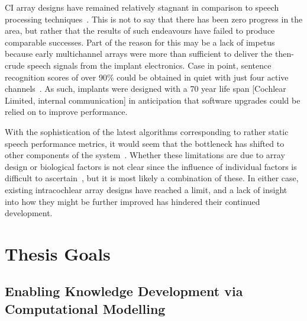 CI array designs have remained relatively stagnant in comparison to speech
processing techniques~\cite{girzon1987, micco2006, whiten2007}. This is not to
say that there has been zero progress in the area, but rather that the results
of such endeavours have failed to produce comparable successes. Part of the
reason for this may be a lack of impetus because early multichannel arrays were
more than sufficient to deliver the then-crude speech signals from the implant
electronics. Case in point, sentence recognition scores of over 90\% could be
obtained in quiet with just four active channels~\cite{shannon1995, dorman1997}.
As such, implants were designed with a 70 year life span [Cochlear Limited,
internal communication] in anticipation that software upgrades could be relied
on to improve performance.

With the sophistication of the latest algorithms corresponding to rather static
speech performance metrics, it would seem that the bottleneck has shifted to
other components of the system~\cite{clark2008,clark2013}. Whether these
limitations are due to array design or biological factors is not clear since the
influence of individual factors is difficult to ascertain~\cite{loizou1998}, but
it is most likely a combination of these. In either case, existing intracochlear
array designs have reached a limit, and a lack of insight into how they might
be further improved has hindered their continued development.


\section{Thesis Goals}
\label{sect:thesis_goals}

\subsection{Enabling Knowledge Development via Computational Modelling}
\label{sect:knowledge_dev}

